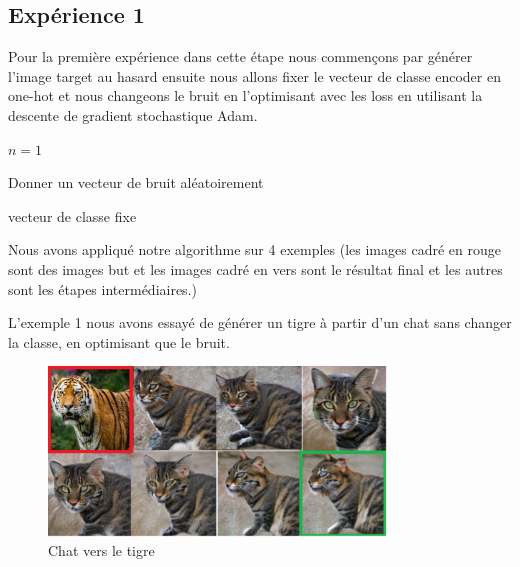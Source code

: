 \subsection{Expérience 1}
Pour la première expérience dans cette étape nous commençons par générer l'image target au hasard ensuite nous allons fixer le vecteur de classe encoder en one-hot et nous changeons le bruit en l'optimisant avec les loss en utilisant la descente de gradient stochastique Adam.

\begin{algorithm}[H]
	
	\SetAlgoLined
	\;
	$ n = 1 $
	
	Donner un vecteur de bruit aléatoirement
	
\caption{vecteur de classe fixe}
\end{algorithm}

Nous avons appliqué notre algorithme sur 4 exemples (les images cadré en rouge sont des images but et les images cadré en vers sont le résultat final et les autres sont les étapes intermédiaires.)

L'exemple 1 nous avons essayé de générer un tigre à partir d'un chat sans changer la classe, en optimisant que le bruit.
\begin{figure}[H] 
	\centering 
	\includegraphics[width=0.8\textwidth]{./resources/img/cat2tiger_0.png} %
	\caption{Chat vers le tigre} %
\end{figure}

